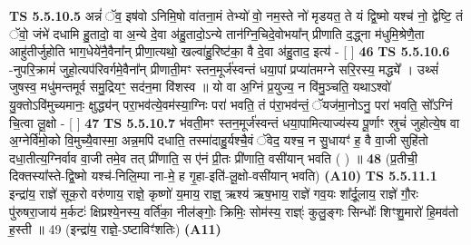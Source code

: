 \documentclass[17pt]{extarticle}
\begin{document}
                  \newline
                                \textbf{ TS 5.5.10.5} \newline
                  अन्नं॑ ॅव॒ इष॑वो ऽनिमि॒षो वा॑तना॒मं तेभ्यो॑ वो॒ नम॒स्ते नो॑ मृडयत॒ ते यं द्वि॒ष्मो यश्च॑ नो॒ द्वेष्टि॒ तं ॅवो॒ जंभे॑ दधामि हु॒तादो॒ वा अ॒न्ये दे॒वा अ॑हु॒तादो॒ऽन्ये तान॑ग्नि॒चिदे॒वोभया᳚न् प्रीणाति द॒द्ध्ना म॑धुमि॒श्रेणै॒ता आहु॑तीर्जुहोति भाग॒धेये॑नै॒वैना᳚न् प्रीणा॒त्यथो॒ खल्वा॑हु॒रिष्ट॑का॒ वै दे॒वा अ॑हु॒ताद॒ इत्य॑ - [  ] \textbf{  46} \newline
                  \newline
                                \textbf{ TS 5.5.10.6} \newline
                  -नुपरि॒क्रामं॑ जुहो॒त्यप॑रिवर्गमे॒वैना᳚न् प्रीणाती॒मꣳ स्तन॒मूर्ज॑स्वन्तं धया॒पां प्रप्या॑तमग्ने सरि॒रस्य॒ मद्ध्ये᳚ । उथ्सं॑ जुषस्व॒ मधु॑मन्तमूर्व समु॒द्रियꣳ॒॒ सद॑न॒मा वि॑शस्व ॥ यो वा अ॒ग्निं प्र॒युज्य॒ न वि॑मु॒ञ्चति॒ यथाऽश्वो॑ यु॒क्तोऽवि॑मुच्यमानः॒ क्षुद्ध्य॑न् परा॒भव॑त्ये॒वम॑स्या॒ग्निः परा॑ भवति॒ तं प॑रा॒भव॑न्तं॒ ॅयज॑मा॒नोऽनु॒ परा॑ भवति॒ सो᳚ऽग्निं चि॒त्वा लू॒क्षो - [  ] \textbf{  47} \newline
                  \newline
                                \textbf{ TS 5.5.10.7} \newline
                  भ॑वती॒मꣳ स्तन॒मूर्ज॑स्वन्तं धया॒पामित्याज्य॑स्य पू॒र्णाꣳ स्रुचं॑ जुहोत्ये॒ष वा अ॒ग्नेर्वि॑मो॒को वि॒मुच्यै॒वास्मा॒ अन्न॒मपि॑ दधाति॒ तस्मा॑दाहु॒र्यश्चै॒वं ॅवेद॒ यश्च॒ न सु॒धायꣳ॑ ह॒ वै वा॒जी सुहि॑तो दधा॒तीत्य॒ग्निर्वाव वा॒जी तमे॒व तत् प्री॑णाति॒ स ए॑नं प्री॒तः प्री॑णाति॒ वसी॑यान् भवति ( ) ॥ \textbf{  48} \newline
                  \newline
                      (प्र॒तीची॒ दिक्तस्या᳚स्ते-द्वि॒ष्मो यश्च॑-निलि॒म्पा ना-मे॒ ह गृ॒हा-इति॑-लू॒क्षो-वसी॑यान् भवति)  \textbf{(A10)} \newline \newline
                                        \textbf{ TS 5.5.11.1} \newline
                   \textbf{ } \newline
                  \newline
                      इन्द्रा॑य॒ राज्ञे॑ सूक॒रो वरु॑णाय॒ राज्ञे॒ कृष्णो॑ य॒माय॒ राज्ञ्॒ ऋश्य॑ ऋष॒भाय॒ राज्ञे॑ गव॒यः शा᳚र्दू॒लाय॒ राज्ञे॑ गौ॒रः पु॑रुषरा॒जाय॑ म॒र्कटः॑ क्षिप्रश्ये॒नस्य॒ वर्ति॑का॒ नील॑ङ्गोः॒ क्रिमिः॒ सोम॑स्य॒ राज्ञ्ः॑ कुलु॒ङ्गः सिन्धोः᳚ शिꣳशु॒मारो॑ हि॒मव॑तो ह॒स्ती ॥ 49 (इन्द्रा॑य॒ राज्ञे॒-ऽष्टाविꣳ॑शतिः)  \textbf{(A11)} \newline \newline
\end{document}
